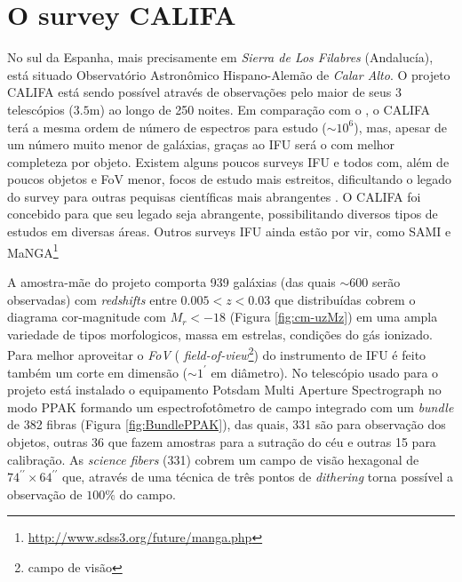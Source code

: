 \section{O survey CALIFA}
\label{sec:CALePyC:Apresent}

No sul da Espanha, mais precisamente em {\em Sierra de Los Filabres} (Andalucía), está situado Observatório Astronômico
Hispano-Alemão de {\em Calar Alto}. O projeto CALIFA está sendo possível através de observações pelo maior de seus 3
telescópios ($3.5$m) ao longo de 250 noites. Em comparação com o \SDSS, o CALIFA terá a mesma ordem de número de
espectros para estudo ($\sim 10^6$), mas, apesar de um número muito menor de galáxias, graças ao IFU será o com melhor
completeza por objeto. Existem alguns poucos surveys IFU e todos com, além de poucos objetos e FoV menor, focos de
estudo mais estreitos, dificultando o legado do survey para outras pequisas científicas mais abrangentes \citep[SAURON;
][região central de 72 galáxias com $z < 0.01$.]{de-Zeeuw2002} \citep[PINGS; ][algumas galáxias muito próximas ($\sim
10$ Mpc) e o estudo atual de 70 (U)LIRGs com $z <0.26$]{RosalesOrtega2010} \citep[VENGA; ][$30$ galáxias
espirais]{Blanc2010}. O CALIFA foi concebido para que seu legado seja abrangente, possibilitando diversos tipos de
estudos em diversas áreas. Outros surveys IFU ainda estão por vir, como SAMI \citep{Croom2012} e
MaNGA\footnote{\url{http://www.sdss3.org/future/manga.php}}

A amostra-mãe do projeto comporta 939 galáxias (das quais $\sim 600$ serão observadas) com {\em redshifts} entre $0.005
< z < 0.03$ que distribuídas cobrem o diagrama cor-magnitude com $M_r < -18$ (Figura \ref{fig:cm-uzMz}) em uma ampla
variedade de tipos morfologicos, massa em estrelas, condições do gás ionizado. Para melhor aproveitar o {\em FoV} ({\em
field-of-view}\footnote{campo de visão}) do instrumento de IFU é feito também um corte em dimensão ($\sim1^{\prime}$ em
diâmetro). No telescópio usado para o projeto está instalado o equipamento Potsdam Multi Aperture Spectrograph
\citep[PMAS; ][]{Roth2005} no modo PPAK \citep{Verheijen2004, Kelz2006} formando um espectrofotômetro de campo integrado
com um {\em bundle} de 382 fibras (Figura \ref{fig:BundlePPAK}), das quais, 331 são para observação dos objetos, outras
36 que fazem amostras para a sutração do céu e outras 15 para calibração. As {\em science fibers} (331) cobrem um campo
de visão hexagonal de $74^{\prime\prime} \times 64^{\prime\prime}$ que, através de uma técnica de três pontos de {\em
dithering} torna possível a observação de $100\%$ do campo.

